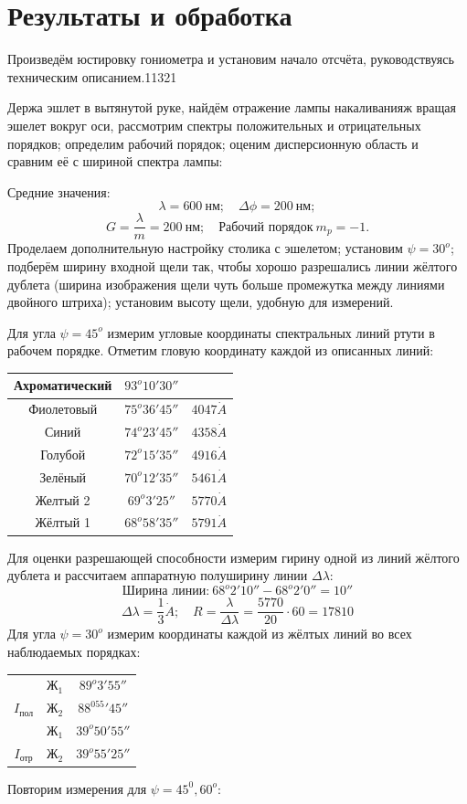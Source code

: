 \documentclass[10pt, a4paper]{article}
\begin{document}
\section*{Результаты и обработка}
Произведём юстировку гониометра и установим начало отсчёта, руководствуясь техническим описанием.11321

Держа эшлет в вытянутой руке, найдём отражение лампы накаливанияж вращая эшелет вокруг оси, рассмотрим спектры положительных и отрицательных порядков; определим рабочий порядок; оценим дисперсионную область и сравним её с шириной спектра лампы:

\noindent
Средние значения:
\[
	\lambda = 600\ нм; \quad \Delta \phi = 200\ нм;
\]
\[
	G = \frac{\lambda}{m} = 200\ нм; \quad \text{Рабочий порядок}\ m_p = -1.
\]
Проделаем дополнительную настройку столика с эшелетом; установим $\psi = 30^o$; подберём ширину входной щели так, чтобы хорошо разрешались линии жёлтого дублета (ширина изображения щели чуть больше промежутка между линиями двойного штриха); установим высоту щели, удобную для измерений.

Для угла $\psi = 45^o$ измерим угловые координаты спектральных линий ртути в рабочем порядке. Отметим гловую координату каждой из описанных линий:
\begin{table}[H]
\centering
\begin{tabular}{|c|c|c|}  \hline
Ахроматический & $93^o 10' 30''$ & {} \\\hline
Фиолетовый & $75^o 36' 45''$ & $4047 \dot A$ \\\hline
Синий & $74^o 23' 45''$ & $4358 \dot A$ \\\hline
Голубой & $72^o15'35''$ & $4916 \dot A$ \\\hline
	Зелёный & $70^o12'35''$ & $5461 \dot A$ \\\hline
Желтый 2 & $69^o 3' 25''$ & $5770 \dot A$ \\\hline
Жёлтый 1 & $68^o 58'35''$ & $5791 \dot A$ \\\hline
\end{tabular}
\end{table}
Для оценки разрешающей способности измерим гирину одной из линий жёлтого дублета и рассчитаем аппаратную полуширину линии $\Delta \lambda$:
\[
\text{Ширина линии:}\ 68^o2'10'' - 68^o2'0'' = 10'' 
\]
\[
\Delta \lambda = \frac{1}{3} \dot A; \quad R = \frac{\lambda}{\Delta \lambda} =\frac{5770}{20} \cdot 60 =  17810
\]
Для угла $\psi = 30^o$ измерим координаты каждой из жёлтых линий во всех наблюдаемых порядках:
\begin{table}[H]
\begin{center}
\begin{tabular}{|c|c|c|} \hline
& $Ж_1$ & $89^o3'55''$ \\
\cline{2-3}
$I_{пол}$
& $Ж_2$ & $88^055'45''$ \\\hline
& $Ж_1$ & $39^o50'55''$ \\
\cline{2-3}
$I_{отр}$
& $Ж_2$ & $39^o55'25''$ \\\hline
\end{tabular}
\end{center}
\end{table}
Повторим измерения для $\psi = 45^0, 60^o$:
\end{document}
